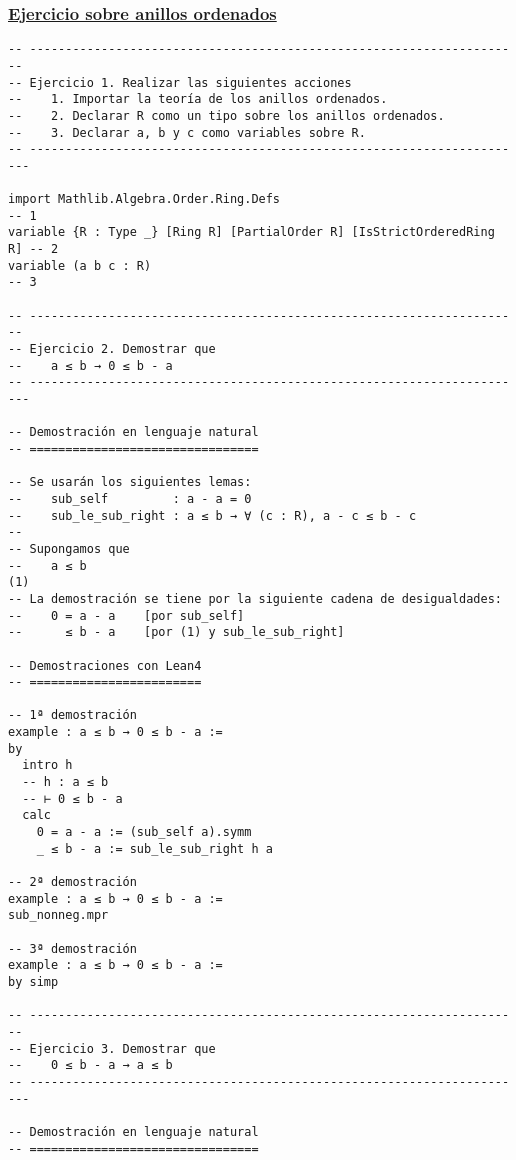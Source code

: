 \subsubsection{\href{./src/Basicos/Ejercicio\_sobre\_anillos\_ordenados.lean}{Ejercicio sobre anillos ordenados}}
\label{sec:org7d50f8c}
\begin{verbatim}
-- ---------------------------------------------------------------------
-- Ejercicio 1. Realizar las siguientes acciones
--    1. Importar la teoría de los anillos ordenados.
--    2. Declarar R como un tipo sobre los anillos ordenados.
--    3. Declarar a, b y c como variables sobre R.
-- ----------------------------------------------------------------------

import Mathlib.Algebra.Order.Ring.Defs                                  -- 1
variable {R : Type _} [Ring R] [PartialOrder R] [IsStrictOrderedRing R] -- 2
variable (a b c : R)                                                    -- 3

-- ---------------------------------------------------------------------
-- Ejercicio 2. Demostrar que
--    a ≤ b → 0 ≤ b - a
-- ----------------------------------------------------------------------

-- Demostración en lenguaje natural
-- ================================

-- Se usarán los siguientes lemas:
--    sub_self         : a - a = 0
--    sub_le_sub_right : a ≤ b → ∀ (c : R), a - c ≤ b - c
--
-- Supongamos que
--    a ≤ b                                                          (1)
-- La demostración se tiene por la siguiente cadena de desigualdades:
--    0 = a - a    [por sub_self]
--      ≤ b - a    [por (1) y sub_le_sub_right]

-- Demostraciones con Lean4
-- ========================

-- 1ª demostración
example : a ≤ b → 0 ≤ b - a :=
by
  intro h
  -- h : a ≤ b
  -- ⊢ 0 ≤ b - a
  calc
    0 = a - a := (sub_self a).symm
    _ ≤ b - a := sub_le_sub_right h a

-- 2ª demostración
example : a ≤ b → 0 ≤ b - a :=
sub_nonneg.mpr

-- 3ª demostración
example : a ≤ b → 0 ≤ b - a :=
by simp

-- ---------------------------------------------------------------------
-- Ejercicio 3. Demostrar que
--    0 ≤ b - a → a ≤ b
-- ----------------------------------------------------------------------

-- Demostración en lenguaje natural
-- ================================


\end{verbatim}
